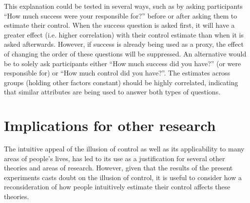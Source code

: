 \documentclass[USenglish,letterpaper,12pt,extrafontsizes,oneside,onecolumn,final]{memoir}
\begin{document}
This explanation could be tested in several ways, such as by asking participants ``How much success were your responsible for?'' before or after asking them to estimate their control.  When the success question is asked first, it will have a greater effect (i.e. higher correlation) with their control estimate than when it is asked afterwards.  However, if success is already being used as a proxy, the effect of changing the order of these questions will be suppressed.  An alternative would be to solely ask participants either ``How much success did you have?'' (or were responsible for) or ``How much control did you have?''.  The estimates across groups (holding other factors constant) should be highly correlated, indicating that similar attributes are being used to answer both types of questions.   

\section{Implications for other research}
The intuitive appeal of the illusion of control as well as its applicability to many areas of people's lives, has led to its use as a justification for several other theories and areas of research.  However, given that the results of the present experiments casts doubt on the illusion of control, it is useful to consider how a reconsideration of how people intuitively estimate their control affects these theories.
\end{document}
